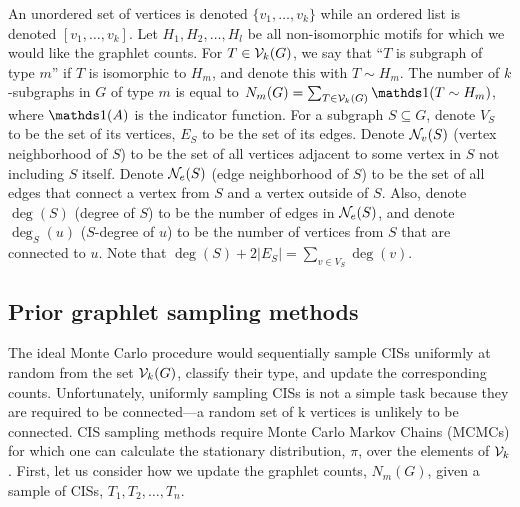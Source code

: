 	An unordered set of vertices is denoted $\{v_1,\ldots,v_k\}$ while an ordered list is denoted $[v_1,\ldots,v_k]$.
	Let $H_1, H_2, \ldots, H_l$ be all non-isomorphic
	motifs for which we would like the graphlet counts. 
	For $T\in \mathcal{V}_k(G)$, we say that ``$T$ is subgraph of
	 type $m$'' if $T$ is isomorphic to $H_m$, and denote this with $T \sim H_m$.
	The number of $k$-subgraphs in $G$ of type $m$ is equal to 
	$N_m (G) = \sum_{T \in \cV_k(G)} \ind(T \sim H_m)$, where $\ind(A)$ 
	is the indicator function.
    For a subgraph $S \subseteq G$, denote $V_S$ to be the set of its vertices, $E_S$ to be the set of its edges.
	Denote $\mathcal{N}_v(S)$ (vertex neighborhood of $S$) to be the set of all vertices adjacent to some vertex in $S$ not including $S$ itself. 
	Denote $\mathcal{N}_e(S)$ (edge neighborhood of $S$) to be the set of all edges that connect a vertex from $S$ and a vertex outside of $S$.
	Also, denote $\deg(S)$ (degree of $S$) to be the number of edges in $\mathcal{N}_e(S)$, and denote $\deg_S(u)$ ($S$-degree of $u$) to be the number of vertices from $S$ that are connected to $u$.
	Note that $\deg(S) + 2|E_S| = \sum_{v\in V_S} \deg(v)$.


    \subsection{Prior graphlet sampling methods}
	
The ideal Monte Carlo procedure would sequentially sample CISs uniformly at random from the set $\mathcal{V}_k(G)$, classify their type, and update the corresponding counts.  
Unfortunately, uniformly sampling CISs is not a simple task because they are required to be connected---a random set of k vertices is unlikely to be connected.
CIS sampling methods require Monte Carlo Markov Chains (MCMCs) for which one can calculate the stationary distribution, $\pi$, over the elements of $\mathcal{V}_k$.
First, let us consider how we update the graphlet counts, $N_m(G)$, given a sample of CISs, $T_1, T_2, \ldots, T_n$.

